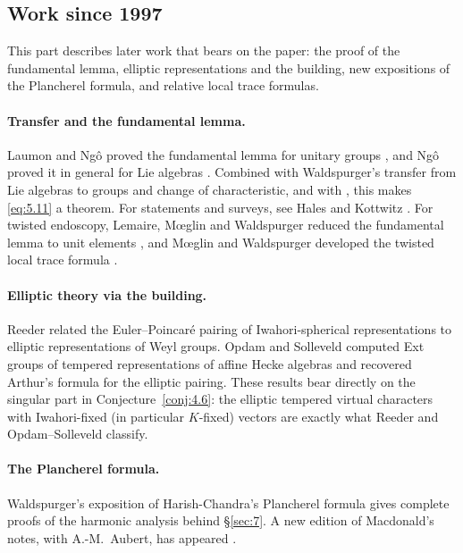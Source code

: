 \documentclass[12pt,letterpaper]{article}
\numberwithin{equation}{section}
\theoremstyle{plain}
\theoremstyle{remark}
\theoremstyle{plain}
\theoremstyle{definition}
\theoremstyle{remark}
\theoremstyle{remark}
\begin{document}
\subsection*{Work since 1997}\label{sec:lit-after}

This part describes later work that bears on the paper: the proof of the fundamental lemma, elliptic representations and the building, new expositions of the Plancherel formula, and relative local trace formulas.

\paragraph{Transfer and the fundamental lemma.} Laumon and Ng\^o proved the fundamental lemma for unitary groups \cite{LN08}, and Ng\^o proved it in general for Lie algebras \cite{Ng10}. Combined with Waldspurger's transfer from Lie algebras to groups and change of characteristic, and with \cite{Ha95}, this makes \eqref{eq:5.11} a theorem. For statements and surveys, see Hales \cite{Ha05} and Kottwitz \cite{Ko05}. For twisted endoscopy, Lemaire, M\oe glin and Waldspurger reduced the fundamental lemma to unit elements \cite{LMW18}, and M\oe glin and Waldspurger developed the twisted local trace formula \cite{MW18}.

\paragraph{Elliptic theory via the building.} Reeder \cite{Re01} related the Euler--Poincar\'e pairing of Iwahori-spherical representations to elliptic representations of Weyl groups. Opdam and Solleveld \cite{OS13} computed Ext groups of tempered representations of affine Hecke algebras and recovered Arthur's formula for the elliptic pairing. These results bear directly on the singular part in Conjecture~\ref{conj:4.6}: the elliptic tempered virtual characters with Iwahori-fixed (in particular $K$-fixed) vectors are exactly what Reeder and Opdam--Solleveld classify.

\paragraph{The Plancherel formula.} Waldspurger's exposition of Harish-Chandra's Plancherel formula \cite{Wa03} gives complete proofs of the harmonic analysis behind \S\ref{sec:7}. A new edition of Macdonald's notes, with A.-M.~Aubert, has appeared \cite{MA26}.
\end{document}
